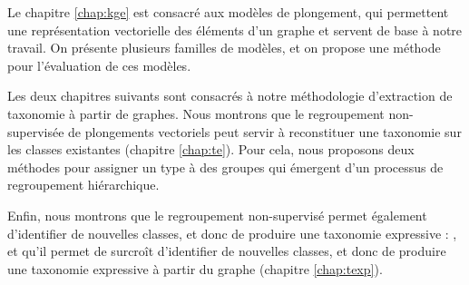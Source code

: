 Le chapitre \ref{chap:kge} est consacré aux modèles de plongement, qui permettent une représentation vectorielle des éléments d'un graphe et servent de base à notre travail. On présente plusieurs familles de modèles, et on propose une méthode pour l'évaluation de ces modèles.





Les deux chapitres suivants sont consacrés à notre méthodologie d'extraction de taxonomie à partir de graphes. Nous montrons que le regroupement non-supervisée de plongements vectoriels peut servir à reconstituer une taxonomie sur les classes existantes (chapitre \ref{chap:te}). Pour cela, nous proposons deux méthodes pour assigner un type à des groupes qui émergent d'un processus de regroupement hiérarchique.



Enfin, nous montrons que le regroupement non-supervisé permet également d'identifier de nouvelles classes, et donc de produire une taxonomie expressive : 
, %
et qu'il permet de surcroît d'identifier de nouvelles classes, et donc de produire une taxonomie expressive à partir du graphe (chapitre \ref{chap:texp}).



\clearpage